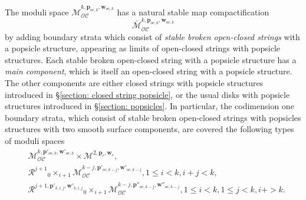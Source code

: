\documentclass[11pt]{amsproc}
\def\cR{\mathcal{R}}
\def\oc{\mathcal{OC}}
\def\M{\mathcal{M}}
\theoremstyle{remark}
\numberwithin{equation}{section}
\begin{document}
The moduli space $\M_{\oc}^{k, \mathbf{p}_{oc, k}, \mathbf{w}_{oc, k}}$ has a natural stable map compactification
\begin{equation}
\bar{\M}_{\oc}^{k, \mathbf{p}_{oc, k}, \mathbf{w}_{oc, k}}
\end{equation}
by adding boundary strata which consist of {\it stable broken open-closed strings} with a popsicle structure,
appearing as limits of open-closed strings with popsicle structures.
Each stable broken open-closed string with a popsicle structure has a {\it main component}, 
which is itself an open-closed string with a popsicle structure.
The other components are either closed strings with popsicle structures introduced in \S\ref{section: closed string popsicle},
or the usual disks with popsicle structures introduced in \S\ref{section: popsicles}.
In particular, the codimension one boundary strata,
which consist of stable broken open-closed strings with popsicles structures with two smooth surface components,
 are covered the following types of moduli spaces
\begin{align}
& \M_{\oc}^{k, \mathbf{p}'_{oc, k}, \mathbf{w}'_{oc, k}} \times \M^{2, \mathbf{p}_{c}, \mathbf{w}_{c}}, \label{oc domain boundary 1} \\ 
& \cR^{j+1} {}_{0}\times_{i+1} \M_{\oc}^{k-j, \mathbf{p}'_{oc, k-j}, \mathbf{w}'_{oc, k-j}}, 1 \le i < k, i+j<k, \label{oc domain boundary 2}\\ 
& \cR^{j+1, \mathbf{p}'_{k, i, j}, \mathbf{w}'_{k, i, j}} {}_{0}\times_{i+1} \M_{\oc}^{k-j, \mathbf{p}''_{oc, k-j}, \mathbf{w}''_{oc, k-j}}, 1 \le i < k, 1 \le j < k, i+ > k. \label{oc domain boundary 3}
\end{align}
\end{document}
